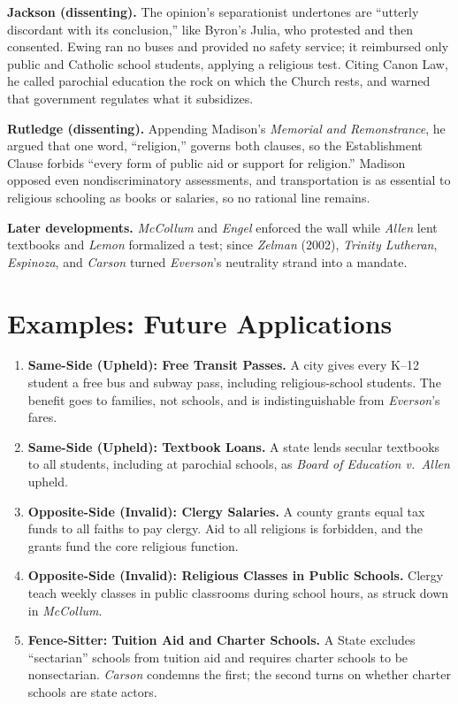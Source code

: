 \documentclass[12pt]{article}
\begin{document}
\textbf{Jackson (dissenting).} The opinion's separationist undertones are ``utterly discordant with its conclusion,'' like Byron's Julia, who protested and then consented. Ewing ran no buses and provided no safety service; it reimbursed only public and Catholic school students, applying a religious test. Citing Canon Law, he called parochial education the rock on which the Church rests, and warned that government regulates what it subsidizes.

\textbf{Rutledge (dissenting).} Appending Madison's \emph{Memorial and Remonstrance}, he argued that one word, ``religion,'' governs both clauses, so the Establishment Clause forbids ``every form of public aid or support for religion.'' Madison opposed even nondiscriminatory assessments, and transportation is as essential to religious schooling as books or salaries, so no rational line remains.

\textbf{Later developments.} \textit{McCollum} and \textit{Engel} enforced the wall while \textit{Allen} lent textbooks and \textit{Lemon} formalized a test; since \textit{Zelman} (2002), \textit{Trinity Lutheran}, \textit{Espinoza}, and \textit{Carson} turned \textit{Everson}'s neutrality strand into a mandate.

\section{Examples: Future Applications}

\begin{enumerate}
\item \textbf{Same-Side (Upheld): Free Transit Passes.} A city gives every K--12 student a free bus and subway pass, including religious-school students. The benefit goes to families, not schools, and is indistinguishable from \textit{Everson}'s fares.
\item \textbf{Same-Side (Upheld): Textbook Loans.} A state lends secular textbooks to all students, including at parochial schools, as \textit{Board of Education v.\ Allen} upheld.
\item \textbf{Opposite-Side (Invalid): Clergy Salaries.} A county grants equal tax funds to all faiths to pay clergy. Aid to all religions is forbidden, and the grants fund the core religious function.
\item \textbf{Opposite-Side (Invalid): Religious Classes in Public Schools.} Clergy teach weekly classes in public classrooms during school hours, as struck down in \textit{McCollum}.
\item \textbf{Fence-Sitter: Tuition Aid and Charter Schools.} A State excludes ``sectarian'' schools from tuition aid and requires charter schools to be nonsectarian. \textit{Carson} condemns the first; the second turns on whether charter schools are state actors.
\end{enumerate}
\end{document}
